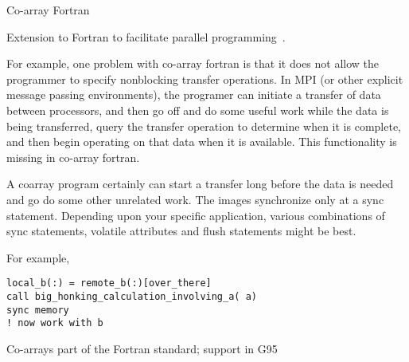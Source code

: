 
 {Co-array Fortran}

Extension to Fortran to facilitate parallel programming~\cite{coarray}.

For example, one problem with co-array fortran is that it does not
allow the programmer to specify nonblocking transfer operations. In
MPI (or other explicit message passing environments), the programer
can initiate a transfer of data between processors, and then go off
and do some useful work while the data is being transferred, query
the transfer operation to determine when it is complete, and then
begin operating on that data when it is available. This
functionality is missing in co-array fortran.

A coarray program certainly can start a transfer long before
the data is needed and go do some other unrelated work.
The images synchronize only at a sync statement.
Depending upon your specific application, various combinations
of sync statements, volatile attributes and flush statements
might be best.

For example,

\begin{verbatim}
local_b(:) = remote_b(:)[over_there]
call big_honking_calculation_involving_a( a)
sync memory
! now work with b
\end{verbatim}

Co-arrays part of the Fortran standard;
support in G95~\cite{g95coarray}
